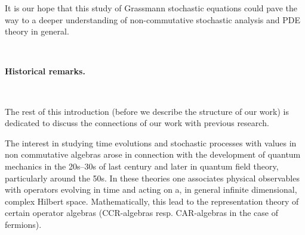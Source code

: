 \documentclass[11pt]{article}
\newcommand{\tmtextbf}[1]{{\bfseries{#1}}}
\begin{document}
It is our hope that this study of Grassmann stochastic equations could pave
the way to a deeper understanding of non-commutative stochastic analysis and
PDE theory in general.

\

{\noindent}\tmtextbf{Historical remarks.}

\

The rest of this introduction (before we describe the structure of our work)
is dedicated to discuss the connections of our work with previous research.

The interest in studying time evolutions and stochastic processes with values
in non commutative algebras arose in connection with the development of
quantum mechanics in the 20s--30s of last century and later in quantum field
theory, particularly around the 50s. In these theories one associates physical
observables with operators evolving in time and acting on a, in general
infinite dimensional, complex Hilbert space. Mathematically, this lead to the
representation theory of certain operator algebras (CCR-algebras resp.
CAR-algebras in the case of fermions).
\end{document}
